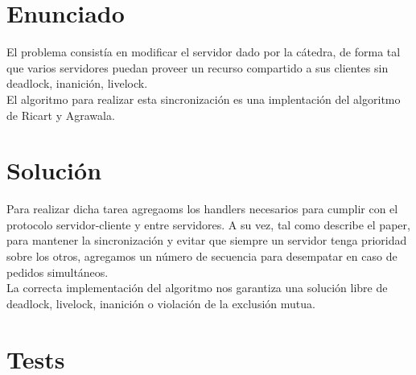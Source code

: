 \section{Enunciado}

El problema consistía en modificar el servidor dado por la cátedra, de forma tal que varios servidores puedan proveer un recurso compartido a sus clientes
sin deadlock, inanición, livelock.\\
El algoritmo para realizar esta sincronización es una implentación del algoritmo de Ricart y Agrawala.

\section{Solución}

Para realizar dicha tarea agregaoms los handlers necesarios para cumplir con el protocolo servidor-cliente y entre servidores.
A su vez, tal como describe el paper, para mantener la sincronización y evitar que siempre un servidor tenga prioridad sobre los otros, agregamos
un número de secuencia para desempatar en caso de pedidos simultáneos.\\
La correcta implementación del algoritmo nos garantiza una solución libre de deadlock, livelock,
inanición o violación de la exclusión mutua.

\section{Tests}

